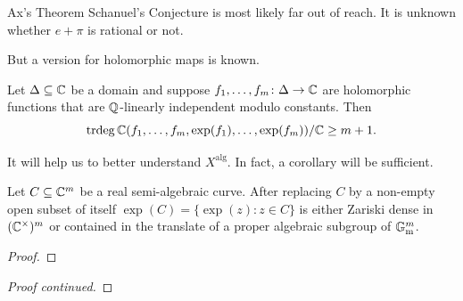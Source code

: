 \documentclass{beamer}
\begin{document}
\begin{frame}{Ax's Theorem}
  Schanuel's Conjecture is most likely far out of reach.
  It is unknown whether $e+\pi$ is rational or not. 

  But a version for holomorphic maps is known.
  
  \begin{theorem}[Ax]
    Let $\Delta\subseteq{\mathbb{C}}$ be a domain and suppose
    $f_1,\ldots,f_m \colon\Delta \rightarrow{\mathbb{C}}$ are holomorphic
    functions that are ${\mathbb{Q}}$-linearly independent \alert{modulo
      constants}. Then
    \begin{equation*}
      \mathrm{trdeg}\,{\mathbb{C}}(f_1,\ldots,f_m,\exp(f_1),\ldots,\exp(f_m))/{\mathbb{C}} \ge
      m+1. 
    \end{equation*}  
  \end{theorem}

  It will help us to better understand $X^{\mathrm{alg}}$. In fact, a
  corollary will be sufficient.
\end{frame}

\begin{frame}
  \begin{corollary}
    Let $C\subseteq{\mathbb{C}}^m$ be a real semi-algebraic curve.
    After replacing $C$ by a non-empty open subset of itself
    $\exp(C)=\{\exp(z) :z\in
    C\}$ is either Zariski dense in
    $({\mathbb{C}}^\times)^m$ or contained in
    the
    translate of a proper algebraic subgroup of ${\mathbb{G}}_{\mathrm{m}}^m$.   
  \end{corollary}
  \begin{proof}\renewcommand{\qedsymbol}{}
    \vspace{4cm}
  \end{proof}
\end{frame}

\begin{frame}
  \begin{proof}[Proof continued]
    \vspace{7cm}
  \end{proof}
\end{frame}
\end{document}
